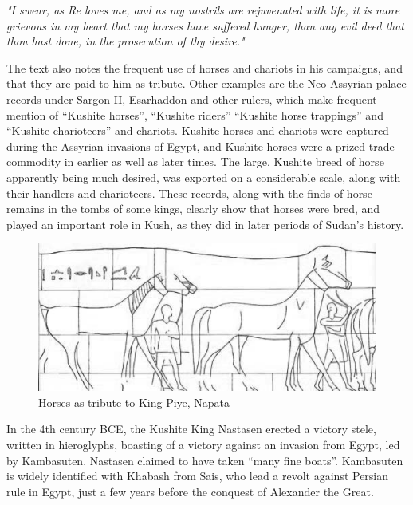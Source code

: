 \documentclass[a4paper,12pt]{scrreprt}
\begin{document}
\begin{center}
\textit{"I swear, as Re loves me, and as my nostrils are rejuvenated with life, it is more grievous in my heart that my horses have suffered hunger, than any evil deed that thou hast done, in the prosecution of thy desire."}\\[12pt]
\end{center}

The text also notes the frequent use of horses and chariots in his campaigns, and that they are paid to him as tribute. Other examples are the Neo Assyrian palace records under Sargon II, Esarhaddon and other rulers, which make frequent mention of “Kushite horses”, “Kushite riders” “Kushite horse trappings” and “Kushite charioteers” and chariots. Kushite horses and chariots were captured during the Assyrian invasions of Egypt, and Kushite horses were a prized trade commodity in earlier as well as later times. The large, Kushite breed of horse apparently being much desired, was exported on a considerable scale, along with their handlers and charioteers. These records, along with the finds of horse remains in the tombs of some kings, clearly show that horses were bred, and played an important role in Kush, as they did in later periods of Sudan’s history.

\begin{figure}[H]
	\centering
	\includegraphics[width=\textwidth]{img/horses_tribute}
	\caption{Horses as tribute to King Piye, Napata}
\end{figure}

In the 4th century BCE, the Kushite King Nastasen erected a victory stele, written in hieroglyphs, boasting of a victory against an invasion from Egypt, led by Kambasuten. Nastasen claimed to have taken “many fine boats”. Kambasuten is widely identified with Khabash from Sais, who lead a revolt against Persian rule in Egypt, just a few years before the conquest of Alexander the Great.
\end{document}
